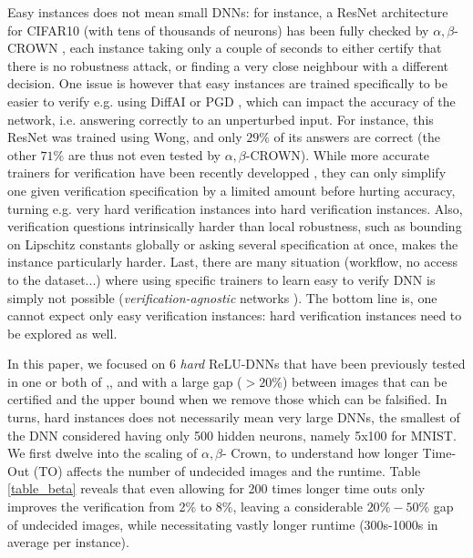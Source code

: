 Easy instances does not mean small DNNs: for instance, a ResNet architecture for CIFAR10 (with tens of thousands of neurons) has been fully checked by $\alpha,\beta$-CROWN \cite{crown}, each instance taking only a couple of seconds to either certify that there is no robustness attack, or finding a very close neighbour with a different decision. One issue is however that easy instances are trained specifically to be easier to verify
e.g. using DiffAI \cite{DiffAI} or PGD \cite{PGD}, which can impact the accuracy of the network, i.e. answering correctly to an unperturbed input. For instance, this ResNet was trained using Wong, and only $29\%$ of its answers are correct (the other $71\%$ are thus not even tested by $\alpha,\beta$-CROWN). While more accurate trainers for verification have been recently developped \cite{TrainingforVerification}, they can only simplify one given verification specification by a limited amount before hurting accuracy, turning e.g. very hard verification instances into hard verification instances.
Also, verification questions intrinsically harder than local robustness, such as 
bounding on Lipschitz constants \cite{lipshitz} globally or asking several specification at once, makes the instance particularly harder. Last, there are many situation (workflow, no access to the dataset...) where using specific trainers to learn easy to verify DNN is simply not possible ({\em verification-agnostic} networks \cite{SDPFI}). The bottom line is, one cannot expect only easy verification instances: hard verification instances need to be explored as well.


In this paper, we focused on 6 {\em hard} ReLU-DNNs that have been previously tested in one or both of \cite{SDPFI},\cite{crown}, and with a large gap ($>20\%$) between images that can be certified and the upper bound when we remove those which can be falsified. In turns, hard instances does not necessarily mean very large DNNs, the smallest of the DNN considered having only 500 hidden neurons, namely 5x100 for MNIST. We first dwelve into the scaling of $\alpha,\beta$- Crown, to understand how longer Time-Out (TO) affects the number of undecided images and the runtime. Table \ref{table_beta} reveals that even allowing for 200 times longer time outs only improves the verification from 2\% to 8\%, leaving a considerable $20\%-50\%$ gap of undecided images, while necessitating vastly longer runtime (300s-1000s in average per instance).


